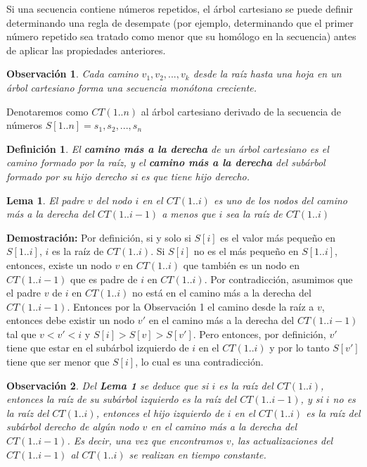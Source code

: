 \documentclass[12pt]{article}
\newcommand{\proof}{\textbf{Demostración:} }
\newcommand{\ct}{árbol cartesiano }
\newcommand{\rmp}{camino más a la derecha }
\newtheorem{lemma}{Lema}
\newtheorem{definition}{Definición}
\newtheorem{observation}{Observación}
\begin{document}
Si una secuencia contiene números repetidos, el \ct se puede definir determinando una regla de desempate (por ejemplo, determinando que el primer número repetido sea tratado como menor que su homólogo en la secuencia) antes de aplicar las propiedades anteriores.

\begin{observation}
	Cada camino $v_1, v_2, ... , v_k$ desde la raíz hasta una hoja en un \ct forma una secuencia monótona creciente.
\end{observation}

Denotaremos como $CT(1..n)$ al \ct derivado de la secuencia de números $S[1..n] = s_1, s_2, ... , s_n$

\begin{definition}
	El \textbf{\rmp}de un \ct es el camino formado por la raíz, y el \textbf{\rmp}del subárbol formado por su hijo derecho si es que tiene hijo derecho.
\end{definition}

\begin{lemma}
	El padre $v$ del nodo $i$ en el $CT(1..i)$ es uno de los nodos del \rmp del $CT(1..i-1)$ a menos que $i$ sea la raíz de $CT(1..i)$
\end{lemma}

\proof Por definición, si y solo si $S[i]$ es el valor más pequeño en $S[1..i]$, $i$ es la raíz de $CT(1..i)$. Si $S[i]$ no es el más pequeño en $S[1..i]$, entonces, existe un nodo $v$ en $CT(1..i)$ que también es un nodo en $CT(1..i-1)$ que es padre de $i$ en $CT(1..i)$. Por contradicción, asumimos que el padre $v$ de $i$ en $CT(1..i)$ no está en el \rmp del $CT(1..i-1)$. Entonces por la Observación 1 el camino desde la raíz a $v$, entonces debe existir un nodo $v'$ en el \rmp del $CT(1..i-1)$ tal que $v < v' < i$ y $S[i] > S[v] > S[v']$. Pero entonces, por definición, $v'$ tiene que estar en el subárbol izquierdo de $i$ en el $CT(1..i)$ y por lo tanto $S[v']$ tiene que ser menor que $S[i]$, lo cual es una contradicción.

\begin{observation}
	Del \textbf{Lema 1} se deduce que si $i$ es la raíz del $CT(1..i)$, entonces la raíz de su subárbol izquierdo es la raíz del $CT(1..i-1)$, y si $i$ no es la raíz del $CT(1..i)$, entonces el hijo izquierdo de $i$ en el $CT(1..i)$ es la raíz del subárbol derecho de algún nodo $v$ en el \rmp del $CT(1..i-1)$. Es decir, una vez que encontramos $v$, las actualizaciones del $CT(1..i-1)$ al $CT(1..i)$ se realizan en tiempo constante.
\end{observation}
\end{document}
